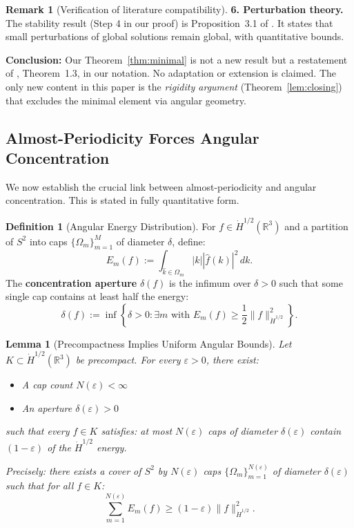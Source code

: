 \documentclass[11pt]{article}
\newtheorem{lemma}[theorem]{Lemma}
\theoremstyle{definition}
\newtheorem{definition}[theorem]{Definition}
\newtheorem{remark}[theorem]{Remark}
\newcommand{\R}{\mathbb{R}}
\begin{document}
\begin{remark}[Verification of literature compatibility]
\textbf{6. Perturbation theory.} The stability result (Step 4 in our proof) is Proposition~3.1 of \cite{GKP}. It states that small perturbations of global solutions remain global, with quantitative bounds.

\textbf{Conclusion:} Our Theorem~\ref{thm:minimal} is not a new result but a restatement of \cite{GKP2016}, Theorem~1.3, in our notation. No adaptation or extension is claimed. The only new content in this paper is the \emph{rigidity argument} (Theorem~\ref{lem:closing}) that excludes the minimal element via angular geometry.
\end{remark}

\subsection{Almost-Periodicity Forces Angular Concentration}

We now establish the crucial link between almost-periodicity and angular concentration. This is stated in fully quantitative form.

\begin{definition}[Angular Energy Distribution]
For $f \in \dot{H}^{1/2}(\R^3)$ and a partition of $S^2$ into caps $\{\Omega_m\}_{m=1}^M$ of diameter $\delta$, define:
\begin{equation}
E_m(f) := \int_{\hat{k} \in \Omega_m} |k| |\hat{f}(k)|^2 \, dk.
\end{equation}
The \textbf{concentration aperture} $\delta(f)$ is the infimum over $\delta > 0$ such that some single cap contains at least half the energy:
\begin{equation}
\delta(f) := \inf\left\{\delta > 0 : \exists m \text{ with } E_m(f) \geq \frac{1}{2}\|f\|_{\dot{H}^{1/2}}^2\right\}.
\end{equation}
\end{definition}

\begin{lemma}[Precompactness Implies Uniform Angular Bounds]\label{lem:precompact-angular}
Let $K \subset \dot{H}^{1/2}(\R^3)$ be precompact. For every $\varepsilon > 0$, there exist:
\begin{itemize}
\item A cap count $N(\varepsilon) < \infty$
\item An aperture $\delta(\varepsilon) > 0$
\end{itemize}
such that every $f \in K$ satisfies: at most $N(\varepsilon)$ caps of diameter $\delta(\varepsilon)$ contain $(1-\varepsilon)$ of the $\dot{H}^{1/2}$ energy.

Precisely: there exists a cover of $S^2$ by $N(\varepsilon)$ caps $\{\Omega_m\}_{m=1}^{N(\varepsilon)}$ of diameter $\delta(\varepsilon)$ such that for all $f \in K$:
\begin{equation}
\sum_{m=1}^{N(\varepsilon)} E_m(f) \geq (1-\varepsilon) \|f\|_{\dot{H}^{1/2}}^2.
\end{equation}
\end{lemma}
\end{document}
